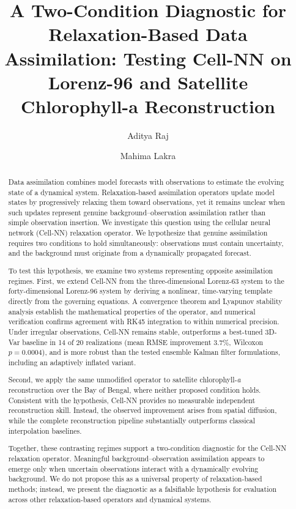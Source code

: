 \documentclass[final,5p,times,twocolumn,authoryear]{elsarticle}
\begin{document}
\begin{frontmatter}

\title{A Two-Condition Diagnostic for Relaxation-Based Data
Assimilation: Testing Cell-NN on Lorenz-96 and Satellite
Chlorophyll-a Reconstruction}

\author{Aditya Raj}
\author{Mahima Lakra}
\address{National Institute of Technology Karnataka (NITK), Surathkal, India}

\begin{abstract}
Data assimilation combines model forecasts with observations to estimate the evolving state of a dynamical system. Relaxation-based assimilation operators update model states by progressively relaxing them toward observations, yet it remains unclear when such updates represent genuine background--observation assimilation rather than simple observation insertion. We investigate this question using the cellular neural network (Cell-NN) relaxation operator. We hypothesize that genuine assimilation requires two conditions to hold simultaneously: observations must contain uncertainty, and the background must originate from a dynamically propagated forecast.

To test this hypothesis, we examine two systems representing opposite assimilation regimes. First, we extend Cell-NN from the three-dimensional Lorenz-63 system to the forty-dimensional Lorenz-96 system by deriving a nonlinear, time-varying template directly from the governing equations. A convergence theorem and Lyapunov stability analysis establish the mathematical properties of the operator, and numerical verification confirms agreement with RK45 integration to within numerical precision. Under irregular observations, Cell-NN remains stable, outperforms a best-tuned 3D-Var baseline in 14 of 20 realizations (mean RMSE improvement 3.7\%, Wilcoxon $p = 0.0004$), and is more robust than the tested ensemble Kalman filter formulations, including an adaptively inflated variant.

Second, we apply the same unmodified operator to satellite chlorophyll-\textit{a} reconstruction over the Bay of Bengal, where neither proposed condition holds. Consistent with the hypothesis, Cell-NN provides no measurable independent reconstruction skill. Instead, the observed improvement arises from spatial diffusion, while the complete reconstruction pipeline substantially outperforms classical interpolation baselines.

Together, these contrasting regimes support a two-condition diagnostic for the Cell-NN relaxation operator. Meaningful background--observation assimilation appears to emerge only when uncertain observations interact with a dynamically evolving background. We do not propose this as a universal property of relaxation-based methods; instead, we present the diagnostic as a falsifiable hypothesis for evaluation across other relaxation-based operators and dynamical systems.
\end{abstract}


\end{frontmatter}
\end{document}
